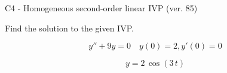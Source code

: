\begin{exercise}
  \begin{exerciseTitle}C4 - Homogeneous second-order linear IVP (ver. 85)\end{exerciseTitle}
  \begin{exerciseStatement}
    
Find the solution to the given IVP.

    
\[y''+9y = 0 \hspace{1em} y(0) = 2 , y'(0) = 0\]

  \end{exerciseStatement}
  \begin{exerciseAnswer}
    
\[y= 2 \, \cos\left(3 \, t\right)\]

  \end{exerciseAnswer}
\end{exercise}